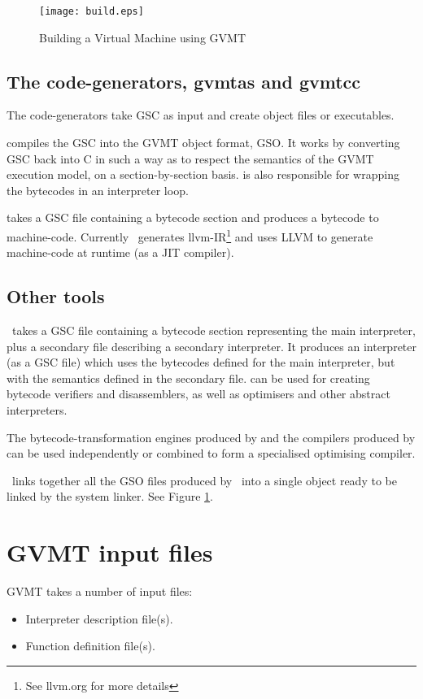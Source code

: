 \begin{figure}[htb]
 \centering
 \caption{Building a Virtual Machine using GVMT\label{fig:build}}
 \texttt{[image: build.eps]}
\end{figure}

\subsection{The code-generators, gvmtas and gvmtcc}
The code-generators take GSC as input and create object files or executables.

\gvmtas{} compiles the GSC into the GVMT object format, GSO. It works by converting GSC back into C in such a way as to respect the semantics of the GVMT execution model, on a section-by-section basis. \gvmtas{} is also responsible for wrapping the bytecodes in an interpreter loop. 

\gvmtcc{} takes a GSC file containing a bytecode section and produces a bytecode to machine-code. Currently \gvmtcc\ generates llvm-IR\footnote{See llvm.org for more details} and uses LLVM to generate machine-code at runtime (as a JIT compiler).

\subsection{Other tools}

\gvmtxc\ takes a GSC file containing a bytecode section representing the main interpreter, plus a secondary file describing a secondary interpreter. It produces an interpreter (as a GSC file) which uses the bytecodes defined for the main interpreter, but with the semantics defined in the secondary file. \gvmtxc{} can be used for creating bytecode verifiers and disassemblers, as well as optimisers and other abstract interpreters.

The bytecode-transformation engines produced by \gvmtxc{} and the compilers produced by \gvmtcc{} can be used independently or combined to form a specialised optimising compiler.

\glink\ links together all the GSO files produced by \gvmtas\ into a single object ready to be linked by the system linker. See Figure \ref{fig:build}.

\section{GVMT input files}
GVMT takes a number of input files:
\begin{itemize}
\item Interpreter description file(s).
\item Function definition file(s).
\end{itemize}


